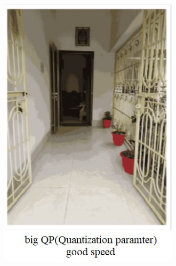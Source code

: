 \documentclass[a4]{article}
\begin{document}
\begin{figure}[H]
	\centering
	\begin{subfigure}{.3\textwidth}
		\centering
		\includegraphics[width=.9\linewidth]{q1_3}
	\end{subfigure}%
	\begin{subfigure}{.3\textwidth}
		\centering

\end{subfigure}
\end{figure}
\end{document}
